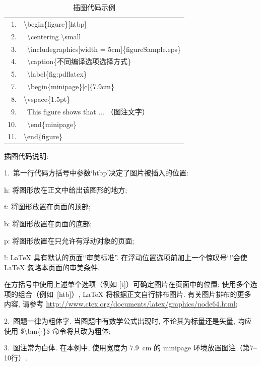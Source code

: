 \documentclass[twoside,twocolumn]{article}
\begin{document}
\begin{CJK}{UTF8}{song}
\begin{table}[!h]
\centering\footnotesize
\caption{插图代码示例}
\label{tab:insertFig}
\begin{tabular*}{7.9cm}{@{}rl}
\toprule[0.75pt]
1. & \textbackslash begin\{figure\}[htbp]\\
2. & \quad\ \textbackslash centering \textbackslash small\\
3. & \quad\ \textbackslash includegraphics[width = 5cm]\{figureSample.eps\}\\
4. & \quad\ \textbackslash caption\{不同编译选项选择方式\}\\
5. & \quad\ \textbackslash label\{fig:pdflatex\}\\
7. & \quad\ \textbackslash begin\{minipage\}[c]\{7.9cm\} \\
8. & \quad\quad\quad \textbackslash vspace\{1.5pt\} \\
9. & \quad\quad\quad \ This figure shows that $\ldots$ （图注文字）\\
10. & \quad\ \textbackslash end\{minipage\} \\
11. & \textbackslash end\{figure\}\\
\bottomrule[0.75pt]
\end{tabular*}
\end{table}

\noindent 插图代码说明: 

1.~第一行代码方括号中参数‘htbp’决定了图片被插入的位置: 

  h: 将图形放在正文中给出该图形的地方;

  t: 将图形放置在页面的顶部;

  b: 将图形放置在页面的底部;

  p: 将图形放置在只允许有浮动对象的页面;

  !: \LaTeX{} 具有默认的页面“审美标准”. 
  在浮动位置选项前加上一个惊叹号‘!’会使 \LaTeX{} 忽略本页面的审美条件.

在方括号中使用上述单个选项（例如 [t]）可确定图片在页面中的位置; 使用多个选项的组合（例如~[htb]）,
\LaTeX{} 将根据正文自行排布图片. 有关图片排布的更多内容, 请参考
\url{http://www.ctex.org/documents/latex/graphics/node64.html};

2.~图题一律为粗体字. 当图题中有数学公式出现时, 不论其为标量还是矢量, 均应
使用 \$\textbackslash bm\{$\cdot$\}\$ 命令将其改为粗体;

3.~图注常为白体. 在本例中, 使用宽度为 7.9~cm 的 minipage
环境放置图注（第7--10行）.



\end{CJK}
\end{document}
